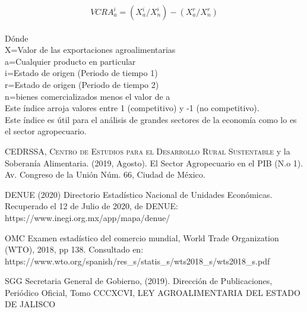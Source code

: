 \documentclass[a4paper]{article}
\begin{document}
\begin{equation}
    VCRA_a^i=(X_a^i/X_n^i  )-(X_a^r/X_n^r   )
\end{equation} \\
Dónde\\ 
X=Valor de las exportaciones agroalimentarias\\
a=Cualquier producto en particular\\
i=Estado de origen (Periodo de tiempo 1)\\
r=Estado de origen (Periodo de tiempo 2)\\
n=bienes comercializados menos el valor de a\\ 

Este índice arroja valores entre 1 (competitivo) y -1 (no competitivo). \\

Este índice es útil para el análisis de grandes sectores de la economía como lo es el sector agropecuario.\\


\begin{thebibliography}{X}
 \textsc{CEDRSSA, Centro de Estudios para el Desarrollo Rural Sustentable} y la Soberanía Alimentaria. (2019, Agosto). El Sector Agropecuario en el PIB (N.o 1). Av. Congreso de la Unión Núm. 66, Ciudad de México. 

 \textsc{DENUE (2020)} Directorio Estadístico Nacional de Unidades Económicas. Recuperado el 12 de Julio de 2020, de DENUE: https://www.inegi.org.mx/app/mapa/denue/ 

 \textsc{OMC} Examen estadístico del comercio mundial, World Trade Organization (WTO), 2018, pp 138. Consultado en: https://www.wto.org/spanish/res\_s/statis\_s/wts2018\_s/wts2018\_s.pdf 

 \textsc{SGG} Secretaria General de Gobierno, (2019). Dirección de Publicaciones, Periódico Oficial, Tomo CCCXCVI, LEY AGROALIMENTARIA DEL ESTADO DE JALISCO

\end{thebibliography}
\end{document}
